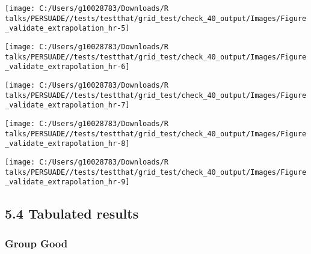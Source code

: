 \documentclass[
]{article}
\begin{document}
\begin{flushleft}\texttt{[image: C:/Users/g10028783/Downloads/R talks/PERSUADE//tests/testthat/grid\_test/check\_40\_output/Images/Figure\_validate\_extrapolation\_hr-5]} \end{flushleft}

\begin{flushleft}\texttt{[image: C:/Users/g10028783/Downloads/R talks/PERSUADE//tests/testthat/grid\_test/check\_40\_output/Images/Figure\_validate\_extrapolation\_hr-6]} \end{flushleft}

\begin{flushleft}\texttt{[image: C:/Users/g10028783/Downloads/R talks/PERSUADE//tests/testthat/grid\_test/check\_40\_output/Images/Figure\_validate\_extrapolation\_hr-7]} \end{flushleft}

\begin{flushleft}\texttt{[image: C:/Users/g10028783/Downloads/R talks/PERSUADE//tests/testthat/grid\_test/check\_40\_output/Images/Figure\_validate\_extrapolation\_hr-8]} \end{flushleft}

\begin{flushleft}\texttt{[image: C:/Users/g10028783/Downloads/R talks/PERSUADE//tests/testthat/grid\_test/check\_40\_output/Images/Figure\_validate\_extrapolation\_hr-9]} \end{flushleft}

\clearpage

\subsection{5.4 Tabulated results}\label{tabulated-results}

\subsubsection{Group Good}\label{group-good}
\end{document}
